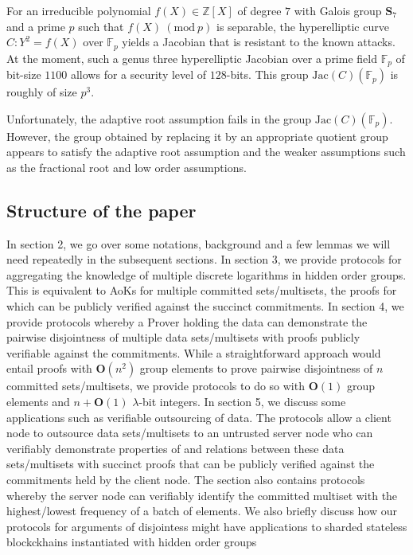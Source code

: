 \documentclass[11pt, lettersize, notitlepage, leqno, footskip=0.6cm]{article}
\newcommand{\bz}{\mathbb Z}
\newcommand{\bFp}{\mathbb{F}_p}
\newcommand{\mbf}{\mathbf}
\newcommand{\mr}{\mathrm}
\newcommand{\Jac}{\mr{Jac}}
\newcommand{\lam}{\lambda}
\newcommand{\bO}{\mbf{O}}
\newcommand{\Mod}[1]{\ (\mathrm{mod}\ #1)}
\numberwithin{equation}{section}
\begin{document}
\begin{enumerate}[wide, labelwidth=!, labelindent=0pt]
For an irreducible polynomial $f(X)\in \bz[X]$ of degree $7$ with Galois group $\mbf{S}_7$ and a prime $p$ such that $f(X)\Mod{p}$ is separable, the hyperelliptic curve $C:Y^2 = f(X)$ over $\bFp$ yields a Jacobian that is resistant to the known attacks. At the moment, such a genus three hyperelliptic Jacobian over a prime field $\bFp$ of bit-size $1100$ allows for a security level of $128$-bits. This group $\Jac(C)(\bFp)$ is roughly of size $p^3$.

Unfortunately, the adaptive root assumption fails in the group $\Jac(C)(\bFp)$. However, the group obtained by replacing it by an appropriate quotient group appears to satisfy the adaptive root assumption and the weaker assumptions such as the fractional root and low order assumptions. \end{enumerate}

\subsection{\fontsize{11}{11}\selectfont Structure of the paper }

In section 2, we go over some notations, background and a few lemmas we will need repeatedly in the subsequent sections. In section 3, we provide protocols for aggregating the knowledge of multiple discrete logarithms in hidden order groups. This is equivalent to AoKs for multiple committed sets/multisets, the proofs for which can be publicly verified against the succinct commitments. In section 4, we provide protocols whereby a Prover holding the data can demonstrate the pairwise disjointness of multiple data sets/multisets with proofs publicly verifiable against the commitments. While a straightforward approach would entail proofs with $\bO(n^2)$ group elements to prove pairwise disjointness of $n$ committed sets/multisets, we provide protocols to do so with $\bO(1)$ group elements and $n+\bO(1)$ $\lam$-bit integers. In section 5, we discuss some applications such as verifiable outsourcing of data. The protocols allow a client node to outsource data sets/multisets to an untrusted server node who can verifiably demonstrate properties of and relations between these data sets/multisets with succinct proofs that can be publicly verified against the commitments held by the client node. The section also contains protocols whereby the server node can verifiably identify the committed multiset with the highest/lowest frequency of a batch of elements. We also briefly discuss how our protocols for arguments of disjointess might have applications to sharded stateless blockckhains instantiated with hidden order groups
\end{document}
